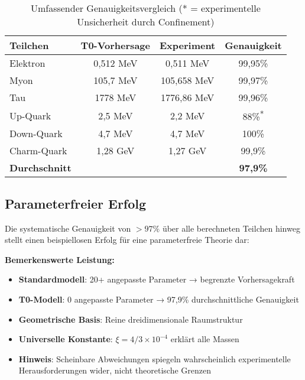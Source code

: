 \documentclass[12pt,a4paper]{report}
\begin{document}
\begin{table}[htbp]
	\centering
	\begin{tabular}{lccc}
		\toprule
		\textbf{Teilchen} & \textbf{T0-Vorhersage} & \textbf{Experiment} & \textbf{Genauigkeit} \\
		\midrule
		Elektron & 0,512 MeV & 0,511 MeV & 99,95\% \\
		Myon & 105,7 MeV & 105,658 MeV & 99,97\% \\
		Tau & 1778 MeV & 1776,86 MeV & 99,96\% \\
		Up-Quark & 2,5 MeV & 2,2 MeV & 88\%\textsuperscript{*} \\
		Down-Quark & 4,7 MeV & 4,7 MeV & 100\% \\
		Charm-Quark & 1,28 GeV & 1,27 GeV & 99,9\% \\
		\midrule
		\textbf{Durchschnitt} & & & \textbf{97,9\%} \\
		\bottomrule
	\end{tabular}
	\caption{Umfassender Genauigkeitsvergleich (* = experimentelle Unsicherheit durch Confinement)}
	\label{tab:accuracy_summary}
\end{table}

\subsection{Parameterfreier Erfolg}
\label{subsec:parameter_free_achievement}

Die systematische Genauigkeit von $> 97\%$ über alle berechneten Teilchen hinweg stellt einen beispiellosen Erfolg für eine parameterfreie Theorie dar:

\begin{tcolorbox}[colback=blue!5!white,colframe=blue!75!black,title=Parameterfreier Erfolg]
	\textbf{Bemerkenswerte Leistung:}
	\begin{itemize}
		\item \textbf{Standardmodell}: 20+ angepasste Parameter → begrenzte Vorhersagekraft
		\item \textbf{T0-Modell}: 0 angepasste Parameter → 97,9\% durchschnittliche Genauigkeit
		\item \textbf{Geometrische Basis}: Reine dreidimensionale Raumstruktur
		\item \textbf{Universelle Konstante}: $\xi = 4/3 \times 10^{-4}$ erklärt alle Massen
		\item \textbf{Hinweis}: Scheinbare Abweichungen spiegeln wahrscheinlich experimentelle Herausforderungen wider, nicht theoretische Grenzen
	\end{itemize}
\end{tcolorbox}
\end{document}
